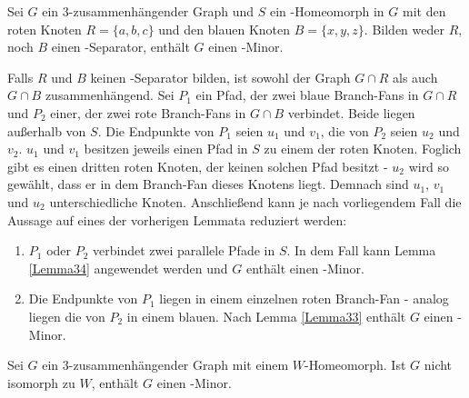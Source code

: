\begin{lemma}\label{Lemma35}
  Sei $G$ ein $3$-zusammenhängender Graph und $S$ ein \kdd-Homeomorph in $G$ mit den roten Knoten $R = \{a, b, c\}$ und den blauen Knoten $B = \{x, y, z\}$.
  Bilden weder $R$, noch $B$ einen \dd-Separator, enthält $G$ einen \kf-Minor.
\end{lemma}
\begin{beweis}
  Falls $R$ und $B$ keinen \dd-Separator bilden, ist sowohl der Graph $G \cap R$ als auch $G \cap B$ zusammenhängend.
  Sei $P_1$ ein Pfad, der zwei blaue Branch-Fans in $G \cap R$ und $P_2$ einer, der zwei rote Branch-Fans in $G \cap B$ verbindet.
  Beide liegen außerhalb von $S$.
  Die Endpunkte von $P_1$ seien $u_1$ und $v_1$, die von $P_2$ seien $u_2$ und $v_2$.
  $u_1$ und $v_1$ besitzen jeweils einen Pfad in $S$ zu einem der roten Knoten.
  Foglich gibt es einen dritten roten Knoten, der keinen solchen Pfad besitzt - $u_2$ wird so gewählt, dass er in dem Branch-Fan dieses Knotens liegt. %
  Demnach sind $u_1$, $v_1$ und $u_2$ unterschiedliche Knoten.
  Anschließend kann je nach vorliegendem Fall die Aussage auf eines der vorherigen Lemmata reduziert werden:
  \begin{enumerate}
    \item $P_1$ oder $P_2$ verbindet zwei parallele Pfade in $S$.
          In dem Fall kann Lemma \ref{Lemma34} angewendet werden und $G$ enthält einen \kf-Minor.
    \item Die Endpunkte von $P_1$ liegen in einem einzelnen roten Branch-Fan - analog liegen die von $P_2$ in einem blauen.
          Nach Lemma \ref{Lemma33} enthält $G$ einen \kf-Minor.
  \end{enumerate}
\end{beweis}

\begin{lemma}\label{Lemma36}
  Sei $G$ ein $3$-zusammenhängender Graph mit einem $W$-Homeomorph.
  Ist $G$ nicht isomorph zu $W$, enthält $G$ einen \kf-Minor.
\end{lemma}

